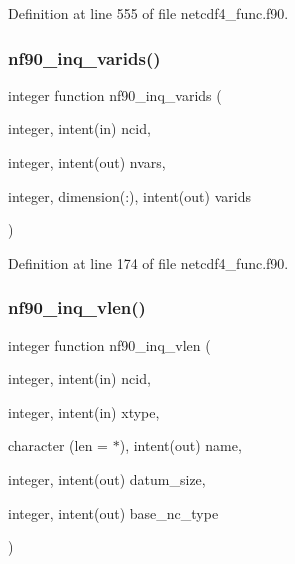 Definition at line 555 of file netcdf4\+\_\+func.\+f90.

\mbox{\label{netcdf4__func_8f90_ac2c9c6c8208c29cdc169469285ddb090}} 
\subsubsection{\texorpdfstring{nf90\+\_\+inq\+\_\+varids()}{nf90\_inq\_varids()}}
{\footnotesize\ttfamily integer function nf90\+\_\+inq\+\_\+varids (\begin{DoxyParamCaption}\item[{integer, intent(in)}]{ncid,  }\item[{integer, intent(out)}]{nvars,  }\item[{integer, dimension(\+:), intent(out)}]{varids }\end{DoxyParamCaption})}



Definition at line 174 of file netcdf4\+\_\+func.\+f90.

\mbox{\label{netcdf4__func_8f90_a2327d1de48a24f08d3365443e5f03007}} 
\subsubsection{\texorpdfstring{nf90\+\_\+inq\+\_\+vlen()}{nf90\_inq\_vlen()}}
{\footnotesize\ttfamily integer function nf90\+\_\+inq\+\_\+vlen (\begin{DoxyParamCaption}\item[{integer, intent(in)}]{ncid,  }\item[{integer, intent(in)}]{xtype,  }\item[{character (len = $\ast$), intent(out)}]{name,  }\item[{integer, intent(out)}]{datum\+\_\+size,  }\item[{integer, intent(out)}]{base\+\_\+nc\+\_\+type }\end{DoxyParamCaption})}



